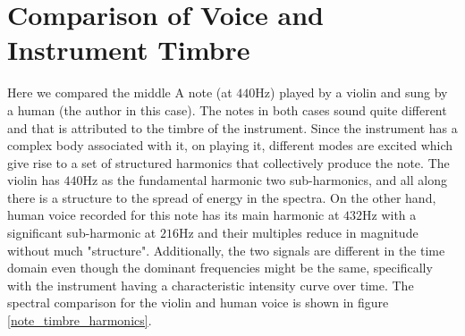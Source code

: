 \documentclass[10pt]{article}
\begin{document}
\section{Comparison of Voice and Instrument Timbre}
Here we compared the middle A note (at $440$Hz) played by a violin and sung by a human (the author in this case). The notes in both cases sound quite different and that is attributed to the timbre of the instrument. Since the instrument has a complex body associated with it, on playing it, different modes are excited which give rise to a set of structured harmonics that collectively produce the note. The violin has $440$Hz as the fundamental harmonic two sub-harmonics, and all along there is a structure to the spread of energy in the spectra. On the other hand, human voice recorded for this note has its main harmonic at $432$Hz with a significant sub-harmonic at $216$Hz and their multiples reduce in magnitude without much "structure". Additionally, the two signals are different in the time domain even though the dominant frequencies might be the same, specifically with the instrument having a characteristic intensity curve over time. The spectral comparison for the violin and human voice is shown in figure \ref{note_timbre_harmonics}.
\end{document}
